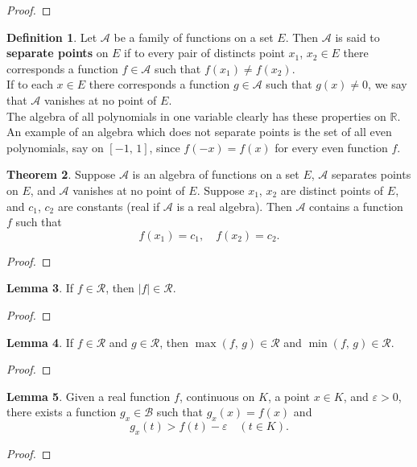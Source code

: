 \documentclass[12pt]{book}
\theoremstyle{definition}
\newtheorem{theorem}{Theorem}[chapter]
\newtheorem{lemma}[theorem]{Lemma}
\newtheorem{definition}[theorem]{Definition}
\newcommand{\R}{\mathbb{R}}
\begin{document}
	\begin{proof}
	\end{proof}
	\newpage
	\begin{definition}
		Let $\mathscr{A}$ be a family of functions on a set $E$. Then $\mathscr{A}$ is said to \textbf{separate points} on $E$ if to every pair of distincts point $x_1$, $x_2\in E$ there corresponds a function $f\in\mathscr{A}$ such that $f(x_1)\neq f(x_2).$ \\
		If to each $x\in E$ there corresponds a function $g\in \mathscr{A}$ such that $g(x)\neq 0$, we say that $\mathscr{A}$ vanishes at no point of $E$. \\
		The algebra of all polynomials in one variable clearly has these properties on $\R$. An example of an algebra which does not separate points is the set of all even polynomials, say on $[-1,\,1]$, since $f(-x)=f(x)$ for every even function $f$.
	\end{definition}
	\newpage
	\begin{theorem}
		Suppose $\mathscr{A}$ is an algebra of functions on a set $E$, $\mathscr{A}$ separates points on $E$, and $\mathscr{A}$ vanishes at no point of $E$. Suppose $x_1$, $x_2$ are distinct points of $E$, and $c_1$, $c_2$ are constants (real if $\mathscr{A}$ is a real algebra). Then $\mathscr{A}$ contains a function $f$ such that $$f(x_1)=c_1,\quad f(x_2)=c_2.$$
	\end{theorem}
	\begin{proof}
	\end{proof}
	\newpage
	\begin{lemma}
		If $f\in\mathscr{R}$, then $|f|\in\mathscr{R}$.
	\end{lemma}
	\begin{proof}
	\end{proof}
	\newpage
	\begin{lemma}
		If $f\in\mathscr{R}$ and $g\in\mathscr{R}$, then $\max(f,\,g)\in\mathscr{R}$ and $\min(f,\,g)\in\mathscr{R}$.
	\end{lemma}
	\begin{proof}
	\end{proof}
	\vfill
	\begin{lemma}
		Given a real function $f$, continuous on $K$, a point $x\in K$, and $\varepsilon >0$, there exists a function $g_x\in\mathscr{B}$ such that $g_x(x)=f(x)$ and $$g_x(t)>f(t)-\varepsilon\quad (t\in K).$$
	\end{lemma}
	\begin{proof}
	\end{proof}
\end{document}
